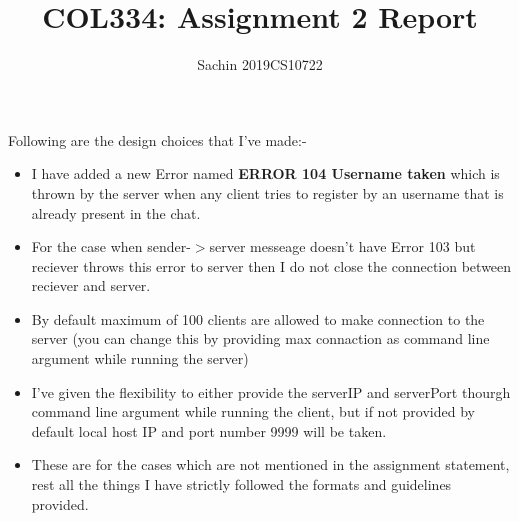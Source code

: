 \documentclass{article}
\title{COL334: Assignment 2 Report}
\author{Sachin 2019CS10722}
\begin{document}
\maketitle

Following are the design choices that I've made:-

\begin{itemize}
    \item I have added a new Error named \textbf{ERROR 104 Username taken} which 
    is thrown by the server when any client tries to register by an username that is 
    already present in the chat.

    \item For the case when sender-$>$server messeage doesn't have Error 103 but reciever throws 
    this error to server then I do not close the connection between reciever and server.

    \item By default maximum of 100 clients are allowed to make connection to the server (you can change
    this by providing max connaction as command line argument while running the server)

    \item I've given the flexibility to either provide the serverIP and serverPort thourgh command line
    argument while running the client, but if not provided by default local host IP and port number 9999
    will be taken.

    \item These are for the cases which are not mentioned in the assignment statement, rest all the things 
    I have strictly followed the formats and guidelines provided.
\end{itemize}
\end{document}
